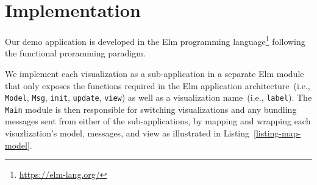 \section{Implementation}
Our demo application is developed in the Elm programming language\footnote{\url{https://elm-lang.org/}} following the functional proramming paradigm.
\begin{listing}
    
    \caption{Example of wrapping the \lstinline{update} function from \lstinline{Visualization1} inside the \lstinline{Main} module's \lstinline{update} function. Commands sent from \lstinline{Visualization1} are then mapped to the \lstinline{Main} modules types.}
    \label{listing-map-model}
\end{listing}
We implement each visualization as a sub-application in a separate Elm module that only exposes the functions required in the Elm application architecture~(i.e., \lstinline{Model}, \lstinline{Msg}, \lstinline{init}, \lstinline{update}, \lstinline{view}) as well as a visualization name~(i.e., \lstinline{label}). The \lstinline{Main} module is then responsible for switching visualizations and any bundling messages sent from either of the sub-applications, by mapping and wrapping each visuzlization's model, messages, and view as illustrated in Listing~\ref{listing-map-model}.

